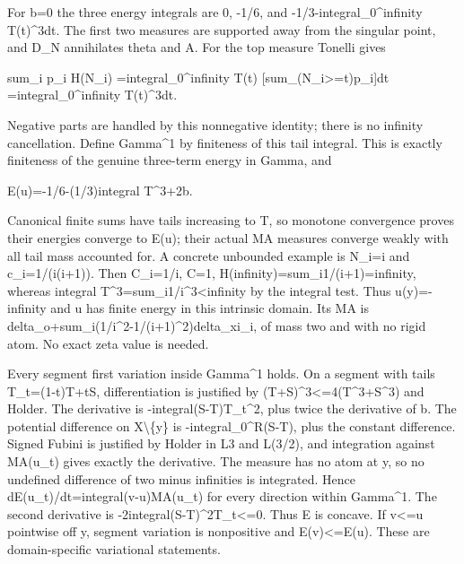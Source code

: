 \documentclass[11pt]{article}
\begin{document}
For b=0 the three energy integrals are 0, -1/6, and -1/3-integral\_0\textasciicircum{}infinity T(t)\textasciicircum{}3dt. The first two measures are supported away from the singular point, and D\_N annihilates theta and A. For the top measure Tonelli gives

sum\_i p\_i H(N\_i)
=integral\_0\textasciicircum{}infinity T(t) [sum\_(N\_i>=t)p\_i]dt
=integral\_0\textasciicircum{}infinity T(t)\textasciicircum{}3dt.

Negative parts are handled by this nonnegative identity; there is no infinity cancellation. Define Gamma\textasciicircum{}1 by finiteness of this tail integral. This is exactly finiteness of the genuine three-term energy in Gamma, and

E(u)=-1/6-(1/3)integral T\textasciicircum{}3+2b.

Canonical finite sums have tails increasing to T, so monotone convergence proves their energies converge to E(u); their actual MA measures converge weakly with all tail mass accounted for. A concrete unbounded example is N\_i=i and c\_i=1/(i(i+1)). Then C\_i=1/i, C=1, H(infinity)=sum\_i1/(i+1)=infinity, whereas integral T\textasciicircum{}3=sum\_i1/i\textasciicircum{}3<infinity by the integral test. Thus u(y)=-infinity and u has finite energy in this intrinsic domain. Its MA is delta\_o+sum\_i(1/i\textasciicircum{}2-1/(i+1)\textasciicircum{}2)delta\_xi\_i, of mass two and with no rigid atom. No exact zeta value is needed.

Every segment first variation inside Gamma\textasciicircum{}1 holds. On a segment with tails T\_t=(1-t)T+tS, differentiation is justified by (T+S)\textasciicircum{}3<=4(T\textasciicircum{}3+S\textasciicircum{}3) and Holder. The derivative is -integral(S-T)T\_t\textasciicircum{}2, plus twice the derivative of b. The potential difference on X\textbackslash{}\{y\} is -integral\_0\textasciicircum{}R(S-T), plus the constant difference. Signed Fubini is justified by Holder in L3 and L(3/2), and integration against MA(u\_t) gives exactly the derivative. The measure has no atom at y, so no undefined difference of two minus infinities is integrated. Hence dE(u\_t)/dt=integral(v-u)MA(u\_t) for every direction within Gamma\textasciicircum{}1. The second derivative is -2integral(S-T)\textasciicircum{}2T\_t<=0. Thus E is concave. If v<=u pointwise off y, segment variation is nonpositive and E(v)<=E(u). These are domain-specific variational statements.
\end{document}
